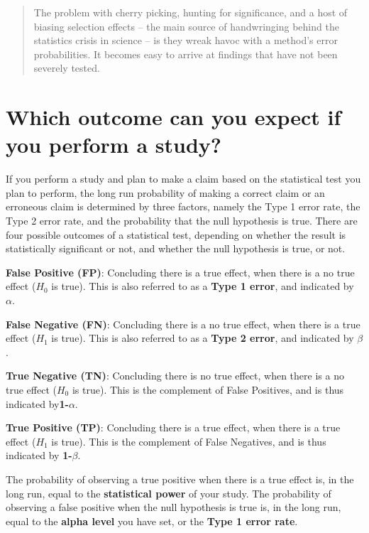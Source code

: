 \documentclass[
  oneside]{book}
\begin{document}
\begin{quote}
The problem with cherry picking, hunting for significance, and a host of biasing selection effects -- the main source of handwringing behind the statistics crisis in science -- is they wreak havoc with a method's error probabilities. It becomes easy to arrive at findings that have not been severely tested.
\end{quote}

\hypertarget{which-outcome-can-you-expect-if-you-perform-a-study}{%
\section{Which outcome can you expect if you perform a study?}\label{which-outcome-can-you-expect-if-you-perform-a-study}}

If you perform a study and plan to make a claim based on the statistical test you plan to perform, the long run probability of making a correct claim or an erroneous claim is determined by three factors, namely the Type 1 error rate, the Type 2 error rate, and the probability that the null hypothesis is true. There are four possible outcomes of a statistical test, depending on whether the result is statistically significant or not, and whether the null hypothesis is true, or not.

\textbf{False Positive (FP)}: Concluding there is a true effect, when there is a no true effect (\(H_0\) is true). This is also referred to as a \textbf{Type 1 error}, and indicated by \textbf{\(\alpha\)}.

\textbf{False Negative (FN)}: Concluding there is a no true effect, when there is a true effect (\(H_1\) is true). This is also referred to as a \textbf{Type 2 error}, and indicated by \textbf{\(\beta\)}.

\textbf{True Negative (TN)}: Concluding there is no true effect, when there is a no true effect (\(H_0\) is true). This is the complement of False Positives, and is thus indicated by\textbf{1-\(\alpha\)}.

\textbf{True Positive (TP)}: Concluding there is a true effect, when there is a true effect (\(H_1\) is true). This is the complement of False Negatives, and is thus indicated by \textbf{1-\(\beta\)}.

The probability of observing a true positive when there is a true effect is, in the long run, equal to the \textbf{statistical power} of your study. The probability of observing a false positive when the null hypothesis is true is, in the long run, equal to the \textbf{alpha level} you have set, or the \textbf{Type 1 error rate}.
\end{document}
